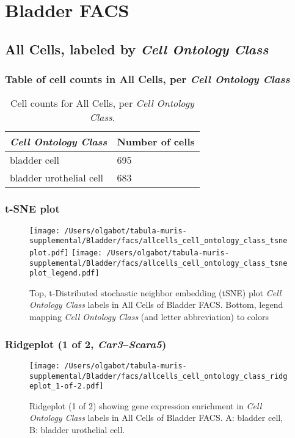 \clearpage
\section{Bladder FACS}

\subsection{All Cells, labeled by \emph{Cell Ontology Class}}
\subsubsection{Table of cell counts in All Cells, per \emph{Cell Ontology Class}}\begin{table}[h]
\centering
\label{my-label}
\begin{tabular}{@{}ll@{}}
\toprule

\emph{Cell Ontology Class}& Number of cells \\ \midrule
bladder cell & 695 \\

bladder urothelial cell & 683 \\
\bottomrule
\end{tabular}
\caption{Cell counts for All Cells, per \emph{Cell Ontology Class}.}
\end{table}

\clearpage
\subsubsection{t-SNE plot}
\begin{figure}[h]
\centering
\texttt{[image: /Users/olgabot/tabula-muris-supplemental/Bladder/facs/allcells\_cell\_ontology\_class\_tsneplot.pdf]}
\texttt{[image: /Users/olgabot/tabula-muris-supplemental/Bladder/facs/allcells\_cell\_ontology\_class\_tsneplot\_legend.pdf]}
\caption{Top, t-Distributed stochastic neighbor embedding (tSNE) plot  \emph{Cell Ontology Class} labels in All Cells of Bladder FACS. Bottom, legend mapping \emph{Cell Ontology Class} (and letter abbreviation) to colors}
\end{figure}


\clearpage

\subsubsection{Ridgeplot (1 of 2, \emph{Car3}--\emph{Scara5})}
\begin{figure}[h]
\centering
\texttt{[image: /Users/olgabot/tabula-muris-supplemental/Bladder/facs/allcells\_cell\_ontology\_class\_ridgeplot\_1-of-2.pdf]}

\caption{ Ridgeplot (1 of 2)  showing gene expression enrichment in \emph{Cell Ontology Class} labels in All Cells of Bladder FACS. A: bladder cell, B: bladder urothelial cell.}
\end{figure}


